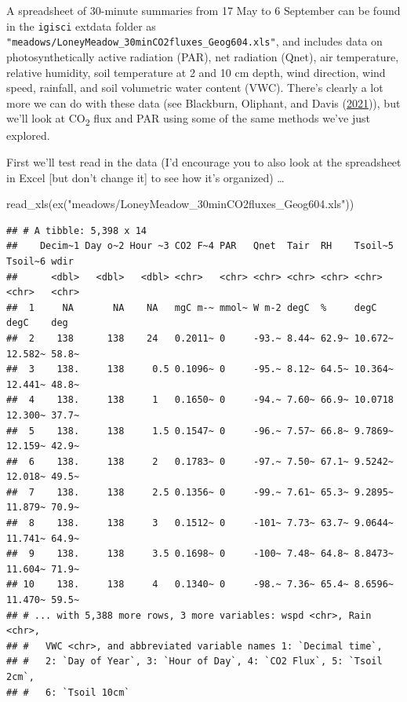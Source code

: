 \documentclass[
]{book}
\newenvironment{Shaded}{\begin{snugshade}}{\end{snugshade}}
\newcommand{\FunctionTok}[1]{\textcolor[rgb]{0,0,0}{#1}}
\newcommand{\NormalTok}[1]{#1}
\newcommand{\StringTok}[1]{\textcolor[rgb]{0.5,0.5,0.5}{#1}}
\begin{document}
A spreadsheet of 30-minute summaries from 17 May to 6 September can be found in the \texttt{igisci} extdata folder as \texttt{"meadows/LoneyMeadow\_30minCO2fluxes\_Geog604.xls"}, and includes data on photosynthetically active radiation (PAR), net radiation (Qnet), air temperature, relative humidity, soil temperature at 2 and 10 cm depth, wind direction, wind speed, rainfall, and soil volumetric water content (VWC). There's clearly a lot more we can do with these data (see Blackburn, Oliphant, and Davis (\protect\hyperlink{ref-blackburn2021carbon}{2021})), but we'll look at CO\textsubscript{2} flux and PAR using some of the same methods we've just explored.

First we'll test read in the data (I'd encourage you to also look at the spreadsheet in Excel {[}but don't change it{]} to see how it's organized) \ldots{}

\begin{Shaded}
\begin{Highlighting}[]
\FunctionTok{read\_xls}\NormalTok{(}\FunctionTok{ex}\NormalTok{(}\StringTok{"meadows/LoneyMeadow\_30minCO2fluxes\_Geog604.xls"}\NormalTok{))}
\end{Highlighting}
\end{Shaded}

\begin{verbatim}
## # A tibble: 5,398 x 14
##    Decim~1 Day o~2 Hour ~3 CO2 F~4 PAR   Qnet  Tair  RH    Tsoil~5 Tsoil~6 wdir 
##      <dbl>   <dbl>   <dbl> <chr>   <chr> <chr> <chr> <chr> <chr>   <chr>   <chr>
##  1     NA       NA    NA   mgC m-~ mmol~ W m-2 degC  %     degC    degC    deg  
##  2    138      138    24   0.2011~ 0     -93.~ 8.44~ 62.9~ 10.672~ 12.582~ 58.8~
##  3    138.     138     0.5 0.1096~ 0     -95.~ 8.12~ 64.5~ 10.364~ 12.441~ 48.8~
##  4    138.     138     1   0.1650~ 0     -94.~ 7.60~ 66.9~ 10.0718 12.300~ 37.7~
##  5    138.     138     1.5 0.1547~ 0     -96.~ 7.57~ 66.8~ 9.7869~ 12.159~ 42.9~
##  6    138.     138     2   0.1783~ 0     -97.~ 7.50~ 67.1~ 9.5242~ 12.018~ 49.5~
##  7    138.     138     2.5 0.1356~ 0     -99.~ 7.61~ 65.3~ 9.2895~ 11.879~ 70.9~
##  8    138.     138     3   0.1512~ 0     -101~ 7.73~ 63.7~ 9.0644~ 11.741~ 64.9~
##  9    138.     138     3.5 0.1698~ 0     -100~ 7.48~ 64.8~ 8.8473~ 11.604~ 71.9~
## 10    138.     138     4   0.1340~ 0     -98.~ 7.36~ 65.4~ 8.6596~ 11.470~ 59.5~
## # ... with 5,388 more rows, 3 more variables: wspd <chr>, Rain <chr>,
## #   VWC <chr>, and abbreviated variable names 1: `Decimal time`,
## #   2: `Day of Year`, 3: `Hour of Day`, 4: `CO2 Flux`, 5: `Tsoil 2cm`,
## #   6: `Tsoil 10cm`
\end{verbatim}
\end{document}
